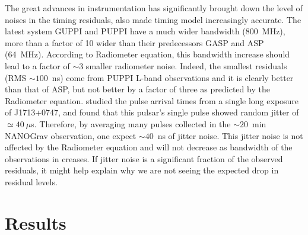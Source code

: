 The great advances in instrumentation has significantly brought down the 
level of noises in the timing residuals, also made timing model increasingly
accurate.
The latest system GUPPI and PUPPI have a much wider bandwidth (800~MHz), more than
a factor of 10 wider than their predecessors GASP and ASP (64~MHz). According to Radiometer 
equation, this bandwidth increase should lead to a factor of $\sim3$
smaller radiometer noise. 
Indeed, the smallest residuals (RMS $\sim100$~ns) come from PUPPI L-band observations
and it is clearly better than that of ASP, but not better by a factor of three
as predicted by the Radiometer equation.
\citet{sc12} studied the pulse arrival times from a single long exposure of
J1713+0747, and found that this pulsar's single pulse showed random jitter of
$\simeq40~\mu$s. Therefore, by averaging many pulses collected in the
$\sim20$~min NANOGrav observation, one expect $\sim 40$~ns of jitter noise. 
This jitter noise is not affected by the Radiometer equation and will not
decrease as bandwidth of the observations in creases.
If jitter noise is a significant fraction of the observed residuals, it might
help explain why we are not seeing the expected drop in residual levels.


\section{Results}
\label{sec:res}


